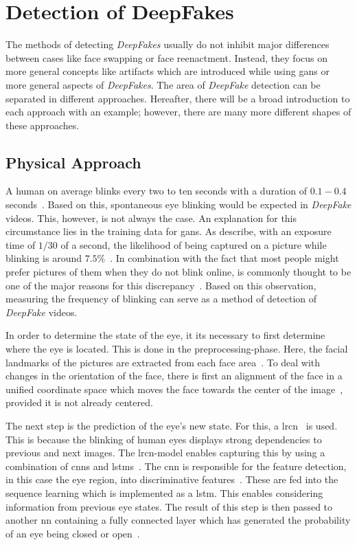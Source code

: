 \section{Detection of DeepFakes}\label{sect:detection}
The methods of detecting \textit{DeepFakes} usually do not inhibit major differences
between cases like face swapping or face reenactment.
Instead, they focus on more general concepts like artifacts which are introduced
while using \glspl{gan} or more general aspects of \textit{DeepFakes}.
The area of \textit{DeepFake} detection can be separated in different approaches.
Hereafter, there will be a broad introduction to each approach with an example; however, there
are many more different shapes of these approaches.

\subsection{Physical Approach}
A human on average blinks every two to ten seconds with a duration of \(0.1-0.4\)
seconds~\cite{li_ictu_2018}. Based on this, spontaneous eye blinking would be
expected in \textit{DeepFake} videos. This, however, is not always the case. An
explanation for this circumstance lies in the training data for \glspl{gan}. As 
\textcite{li_ictu_2018} describe, with an exposure time of \(1/30\) of a second,
the likelihood of being captured on a picture while blinking is around \(7.5\%\)~\cite{li_ictu_2018}.
In combination with the fact that most people might prefer pictures of them when
they do not blink online, is commonly thought to be one of the major reasons for
this discrepancy~\cite{pishori_detecting_2020}. Based on this observation, measuring the frequency of blinking can serve as a method of detection of
\textit{DeepFake} videos.

\par
In order to determine the state of the eye, it its necessary to first determine
where the eye is located. This is done in the preprocessing-phase. Here, the facial
landmarks of the pictures are extracted from each face area~\cite{li_ictu_2018}.
To deal with changes in the orientation of the face, there is first an alignment
of the face in a unified coordinate space which moves the face towards the center of the image~\cite{li_ictu_2018}, provided it is not already centered.

\par
The next step is the prediction of the eye's new state. For this, a \gls{lrcn}~\cite{donahue_long-term_2014}
is used. This is because the blinking of human eyes displays strong dependencies to
previous and next images. The \gls{lrcn}-model enables capturing this by using
a combination of \glspl{cnn} and \glspl{lstm}~\cite{donahue_long-term_2014}.
The \gls{cnn} is responsible for the feature detection, in this case the eye
region, into discriminative features~\cite{li_ictu_2018,donahue_long-term_2014}. 
These are fed into the sequence learning which is implemented as a \gls{lstm}.
This enables considering information from previous eye states. The result of
this step is then passed to another \gls{nn} containing a fully connected layer
which has generated the probability of an eye being closed or open~\cite{li_ictu_2018}.

